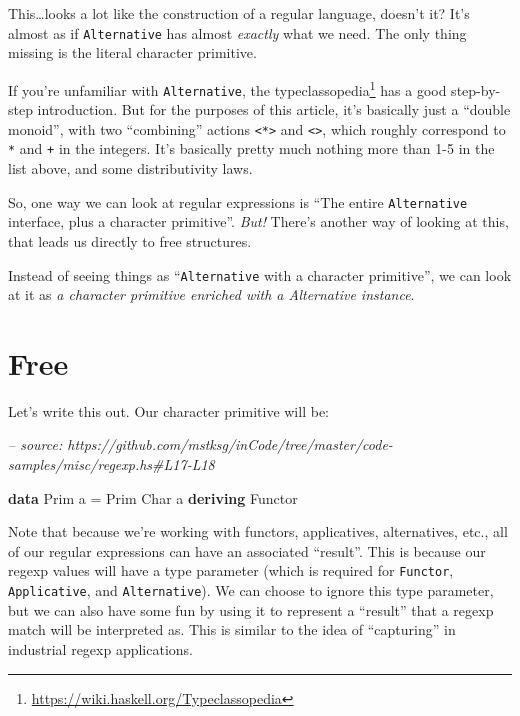 \documentclass[]{article}
\newenvironment{Shaded}{}{}
\newcommand{\CommentTok}[1]{\textcolor[rgb]{0.38,0.63,0.69}{\textit{#1}}}
\newcommand{\DataTypeTok}[1]{\textcolor[rgb]{0.56,0.13,0.00}{#1}}
\newcommand{\FunctionTok}[1]{\textcolor[rgb]{0.02,0.16,0.49}{#1}}
\newcommand{\KeywordTok}[1]{\textcolor[rgb]{0.00,0.44,0.13}{\textbf{#1}}}
\newcommand{\NormalTok}[1]{#1}
\renewcommand{\href}[2]{#2\footnote{\url{#1}}}
\begin{document}
This\ldots{}looks a lot like the construction of a regular language, doesn't it?
It's almost as if \texttt{Alternative} has almost \emph{exactly} what we need.
The only thing missing is the literal character primitive.

If you're unfamiliar with \texttt{Alternative}, the
\href{https://wiki.haskell.org/Typeclassopedia}{typeclassopedia} has a good
step-by-step introduction. But for the purposes of this article, it's basically
just a ``double monoid'', with two ``combining'' actions
\texttt{\textless{}*\textgreater{}} and
\texttt{\textless{}\textbar{}\textgreater{}}, which roughly correspond to
\texttt{*} and \texttt{+} in the integers. It's basically pretty much nothing
more than 1-5 in the list above, and some distributivity laws.

So, one way we can look at regular expressions is ``The entire
\texttt{Alternative} interface, plus a character primitive''. \emph{But!}
There's another way of looking at this, that leads us directly to free
structures.

Instead of seeing things as ``\texttt{Alternative} with a character primitive'',
we can look at it as \emph{a character primitive enriched with a Alternative
instance}.

\hypertarget{free}{%
\section{Free}\label{free}}

Let's write this out. Our character primitive will be:

\begin{Shaded}
\begin{Highlighting}[]
\CommentTok{-- source: https://github.com/mstksg/inCode/tree/master/code-samples/misc/regexp.hs#L17-L18}

\KeywordTok{data} \DataTypeTok{Prim}\NormalTok{ a }\FunctionTok{=} \DataTypeTok{Prim} \DataTypeTok{Char}\NormalTok{ a}
  \KeywordTok{deriving} \DataTypeTok{Functor}
\end{Highlighting}
\end{Shaded}

Note that because we're working with functors, applicatives, alternatives, etc.,
all of our regular expressions can have an associated ``result''. This is
because our regexp values will have a type parameter (which is required for
\texttt{Functor}, \texttt{Applicative}, and \texttt{Alternative}). We can choose
to ignore this type parameter, but we can also have some fun by using it to
represent a ``result'' that a regexp match will be interpreted as. This is
similar to the idea of ``capturing'' in industrial regexp applications.
\end{document}
